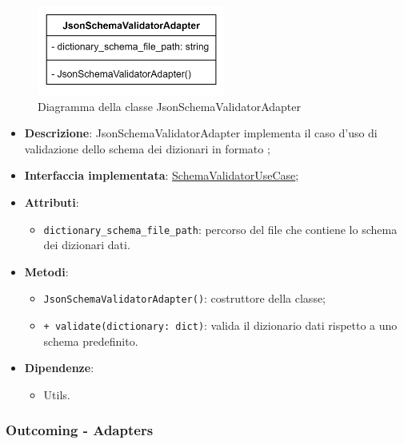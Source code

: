  \label{JsonSchemaValidatorAdapter}
\begin{figure}[H]
    \centering
    \includegraphics[width=0.55\textwidth]{assets/Backend/json_schema_validator_adapter.png}
    \caption{Diagramma della classe JsonSchemaValidatorAdapter}
  \end{figure}
\begin{itemize}
    \item \textbf{Descrizione}: JsonSchemaValidatorAdapter implementa il caso d'uso di validazione dello schema dei dizionari in formato ;
    \item \textbf{Interfaccia implementata}: \hyperref[SchemaValidatorUseCase]{SchemaValidatorUseCase};
    \item \textbf{Attributi}:
    \begin{itemize}
        \item \texttt{dictionary\_schema\_file\_path}: percorso del file  che contiene lo schema dei dizionari dati.
    \end{itemize}
    \item \textbf{Metodi}:
    \begin{itemize}
        \item \texttt{JsonSchemaValidatorAdapter()}: costruttore della classe;
        \item \texttt{+ validate(dictionary: dict)}: valida il dizionario dati rispetto a uno schema predefinito.
    \end{itemize}
    \item \textbf{Dipendenze}:
    \begin{itemize}
        \item Utils.
    \end{itemize}
\end{itemize} 

\subsubsection{Outcoming - Adapters}

